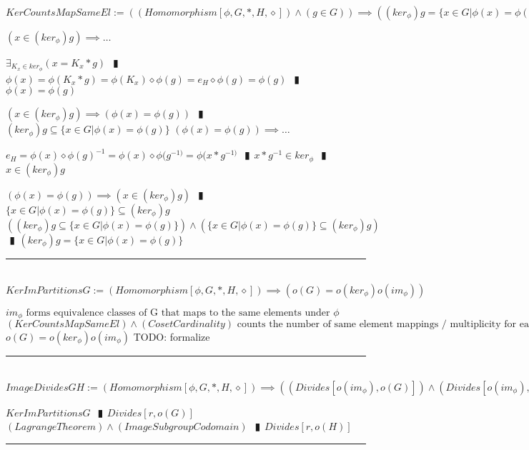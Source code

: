 \documentclass{book}
\newcommand{\abr}{:=}
\newcommand{\pipe}{$\phantom{(}\vrectangleblack\phantom{)}$}
\newcommand{\pr}[1]{\left(#1\right)}
\begin{document}
$KerCountsMapSameEl \abr \pr{(Homomorphism[\phi, G, *, H, \diamond]) \land (g \in G)} \implies \pr{(ker_\phi) g = \{x \in G | \phi(x) = \phi(g)\}}$
\begin{enumerate}
  \lit $\pr{x \in (ker_\phi) g} \implies \ldots$
  \begin{enumerate}
    \lit $\exists_{K_x \in ker_\phi}(x = K_x * g)$ \pipe $\phi(x) = \phi(K_x * g) = \phi(K_x) \diamond \phi(g) = e_H \diamond \phi(g) = \phi(g)$ \pipe $\phi(x) = \phi(g)$
  \end{enumerate}
  \lit $\pr{x \in (ker_\phi) g} \implies \pr{\phi(x) = \phi(g)}$ \pipe $(ker_\phi) g \subseteq \{x \in G | \phi(x) = \phi(g)\}$
  \lit $\pr{\phi(x) = \phi(g)} \implies \ldots$
  \begin{enumerate}
    \lit $e_H = \phi(x) \diamond \phi(g)^{-1} = \phi(x) \diamond \phi(g^{-1)} = \phi(x * g^{-1)}$ \pipe $x * g^{-1} \in ker_\phi$ \pipe $x \in (ker_\phi) g$
  \end{enumerate}
  \lit $\pr{\phi(x) = \phi(g)} \implies \pr{x \in (ker_\phi) g}$ \pipe $\{x \in G | \phi(x) = \phi(g)\} \subseteq (ker_\phi) g$
  \lit $\pr{(ker_\phi) g \subseteq \{x \in G | \phi(x) = \phi(g)\}} \land \pr{\{x \in G | \phi(x) = \phi(g)\} \subseteq (ker_\phi) g}$ \pipe $(ker_\phi) g = \{x \in G | \phi(x) = \phi(g)\}$
\end{enumerate} \vspace{.75mm} \hrule \vspace{.75mm} \ \\ 

$KerImPartitionsG \abr (Homomorphism[\phi, G, *, H, \diamond]) \implies \pr{o(G) = o(ker_\phi) o(im_\phi)}$
\begin{enumerate}
  \lit $\text{$im_\phi$ forms equivalence classes of G that maps to the same elements under $\phi$}$
  \lit $\text{$(KerCountsMapSameEl) \land (CosetCardinality)$ counts the number of same element mappings / multiplicity for each pre-image class}$
  \lit $o(G) = o(ker_\phi) o(im_\phi)$
  \lit TODO: formalize
\end{enumerate} \vspace{.75mm} \hrule \vspace{.75mm} \ \\ 

$ImageDividesGH \abr (Homomorphism[\phi, G, *, H, \diamond]) \implies \pr{\pr{Divides[o(im_\phi), o(G)]} \land \pr{Divides[o(im_\phi), o(H)]}}$
\begin{enumerate}
  \lit $KerImPartitionsG$ \pipe $Divides[r, o(G)]$
  \lit $(LagrangeTheorem) \land (ImageSubgroupCodomain)$ \pipe $Divides[r, o(H)]$
\end{enumerate} \vspace{.75mm} \hrule \vspace{.75mm} \ \\ 
\end{document}
